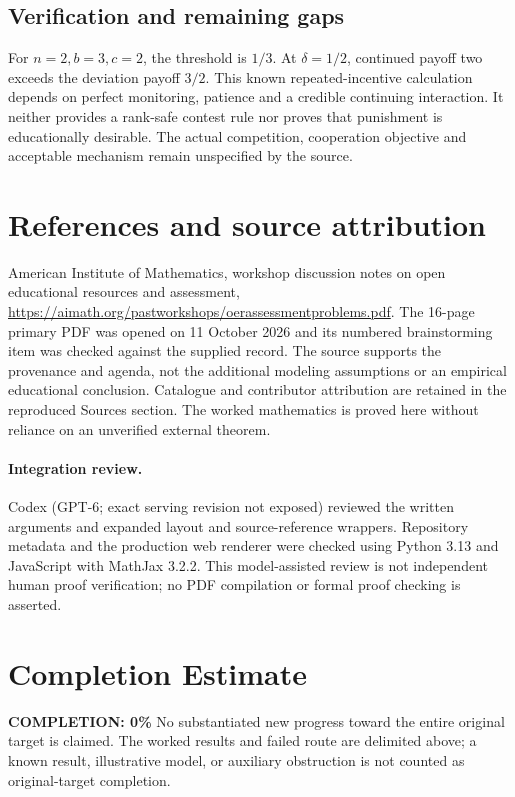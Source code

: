\documentclass[11pt]{article}
\begin{document}
\subsection{Verification and remaining gaps}
For $n=2,b=3,c=2$, the threshold is $1/3$. At $\delta=1/2$, continued payoff two exceeds the deviation payoff $3/2$. This known repeated-incentive calculation depends on perfect monitoring, patience and a credible continuing interaction. It neither provides a rank-safe contest rule nor proves that punishment is educationally desirable. The actual competition, cooperation objective and acceptable mechanism remain unspecified by the source.

\section{References and source attribution}
American Institute of Mathematics, workshop discussion notes on open educational resources and assessment, \url{https://aimath.org/pastworkshops/oerassessmentproblems.pdf}. The 16-page primary PDF was opened on 11 October 2026 and its numbered brainstorming item was checked against the supplied record. The source supports the provenance and agenda, not the additional modeling assumptions or an empirical educational conclusion. Catalogue and contributor attribution are retained in the reproduced Sources section. The worked mathematics is proved here without reliance on an unverified external theorem.


\paragraph{Integration review.} Codex (GPT-6; exact serving revision not exposed) reviewed the written arguments and expanded layout and source-reference wrappers. Repository metadata and the production web renderer were checked using Python 3.13 and JavaScript with MathJax 3.2.2. This model-assisted review is not independent human proof verification; no PDF compilation or formal proof checking is asserted.

\section{Completion Estimate}
\noindent\textbf{COMPLETION: 0\%}
No substantiated new progress toward the entire original target is claimed. The worked results and failed route are delimited above; a known result, illustrative model, or auxiliary obstruction is not counted as original-target completion.
\end{document}
